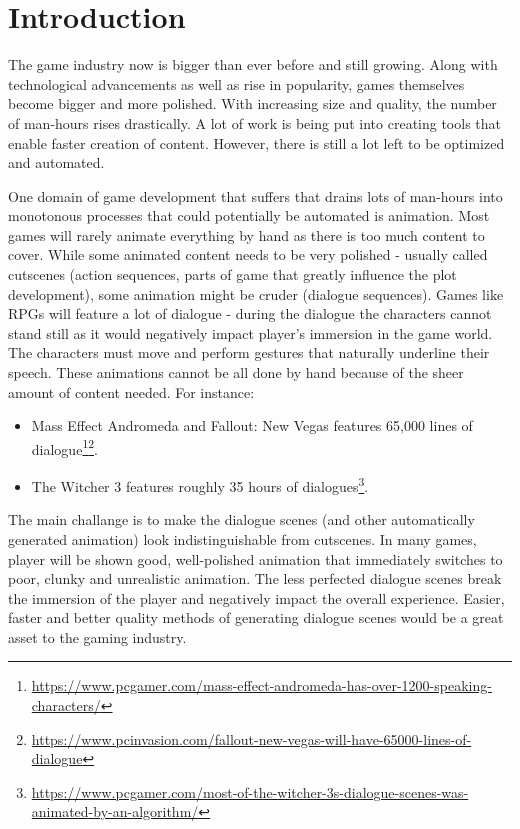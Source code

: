 \chapter{Introduction\label{chap:introduction}}

The game industry now is bigger than ever before and still growing. Along with technological advancements as well as rise in popularity, games themselves become bigger and more polished. With increasing size and quality, the number of man-hours rises drastically. A lot of work is being put into creating tools that enable faster creation of content. However, there is still a lot left to be optimized and automated.

One domain of game development that suffers that drains lots of man-hours into monotonous processes that could potentially be automated is animation. Most games will rarely animate everything by hand as there is too much content to cover. While some animated content needs to be very polished - usually called cutscenes (action sequences, parts of game that greatly influence the plot development), some animation might be cruder (dialogue sequences). Games like RPGs will feature a lot of dialogue - during the dialogue the characters cannot stand still as it would negatively impact player's immersion in the game world. The characters must move and perform gestures that naturally underline their speech. These animations cannot be all done by hand because of the sheer amount of content needed. For instance:

\begin{itemize}
\item Mass Effect Andromeda and Fallout:  New Vegas features 65,000 lines of dialogue\footnote{\url{https://www.pcgamer.com/mass-effect-andromeda-has-over-1200-speaking-characters/}}\footnote{\url{https://www.pcinvasion.com/fallout-new-vegas-will-have-65000-lines-of-dialogue}}.

\item The Witcher 3 features roughly 35 hours of dialogues\footnote{\url{https://www.pcgamer.com/most-of-the-witcher-3s-dialogue-scenes-was-animated-by-an-algorithm/}}.

\end{itemize}

The main challange is to make the dialogue scenes (and other automatically generated animation) look indistinguishable from cutscenes. In many games, player will be shown good, well-polished animation that immediately switches to poor, clunky and unrealistic animation. The less perfected dialogue scenes break the immersion of the player and negatively impact the overall experience. Easier, faster and better quality methods of generating dialogue scenes would be a great asset to the gaming industry.

